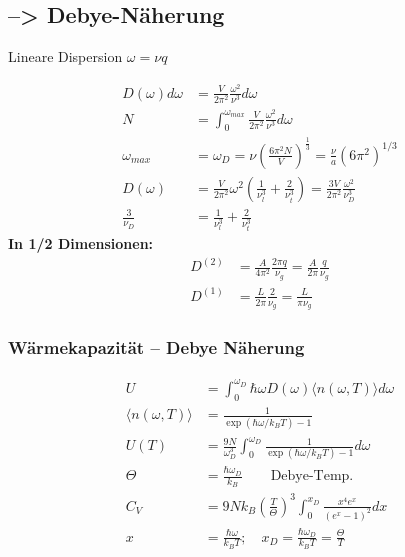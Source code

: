 \subsection*{--> Debye-Näherung}
Lineare Dispersion $\omega = \nu q$

\begin{equation*}
    \begin{aligned}
        D(\omega)d \omega &= \frac{V}{2 \pi^2} \frac{\omega^2}{\nu^3} d\omega  \\
        N &= \int_0^{\omega_{max}} \frac{V}{2 \pi^2} \frac{\omega^2}{\nu^3} d\omega \\
        \omega_{max} &= \omega_D = \nu \left(\frac{6 \pi^2 N}{V}\right)^{\frac{1}{3}} = \frac{\nu}{a} \left(6 \pi^2\right)^{1/3} \\
        D(\omega) &= \frac{V}{2 \pi^2} \omega^2 \left(\frac{1}{\nu_l^3} + \frac{2}{\nu_t^3}\right) = \frac{3 V}{2 \pi^2} \frac{\omega^2}{\nu_D^3} \\
        \frac{3}{\nu_D} &= \frac{1}{\nu_l^3} + \frac{2}{\nu_t^3}
    \end{aligned}
\end{equation*}
\textbf{In 1/2 Dimensionen:}
\begin{equation*}
    \begin{aligned}
        D^{(2)} &= \frac{A}{4 \pi^2} \frac{2 \pi q}{\nu_g} = \frac{A}{2 \pi} \frac{q}{\nu_g} \\
        D^{(1)} &= \frac{L}{2 \pi} \frac{2}{\nu_g} = \frac{L}{\pi \nu_g}
    \end{aligned}
\end{equation*}

\subsubsection*{Wärmekapazität – Debye Näherung}
\begin{equation*}
    \begin{aligned}
        U &= \int_0^{\omega_D} \hbar \omega D(\omega) \langle n(\omega, T) \rangle d\omega \\
        \langle n(\omega,T) \rangle &= \frac{1}{\exp(\hbar \omega / k_B T) -1} \\
        U(T) &= \frac{9N}{\omega_D^3} \int_0^{\omega_D} \frac{1}{\exp(\hbar \omega / k_B T) -1} d\omega \\
        \Theta &= \frac{\hbar \omega_D}{k_B} \qquad \text{Debye-Temp.} \\
        C_V &= 9Nk_B \left(\frac{T}{\Theta}\right)^3 \int_0^{x_D} \frac{x^4 e^x}{(e^x -1)^2} dx \\
        x &= \frac{\hbar \omega}{k_B T}; \quad x_D = \frac{\hbar \omega_D}{k_B T} = \frac{\Theta}{T}
    \end{aligned}
\end{equation*}

